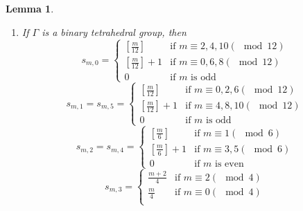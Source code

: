 \documentclass{amsart}[12pt]
\newtheorem{lemma}[theorem]{Lemma}
\theoremstyle{definition}
\theoremstyle{remark}
\numberwithin{equation}{section}
\begin{document}
\begin{lemma}
\begin{enumerate}
\[\begin{cases}
[\frac{m}{2n - 4}] + 1 & \textrm{if $m \equiv 4k (\mod 2n - 4)$ } \\
[\frac{m}{2n - 4}] & \textrm{if $m \equiv 4k + 2 (\mod 2n - 4)$ } \\
0 & \textrm{if $m$ is odd}
\end{cases}
\]
for $0 \leq k \leq n/2 - 2$.
\[
s_{m, 1} = 
\begin{cases} 
[\frac{m}{2n - 4}] + 1 & \textrm{if $m \equiv 4k + 2 (\mod 2n - 4)$ } \\
[\frac{m}{2n - 4}] & \textrm{if $m \equiv 4k (\mod 2n - 4)$ } \\
0 & \textrm{if $m$ is odd}
\end{cases}
\]
for $0 \leq k \leq n/2 - 4$.
\[
s_{m, n - 1} = s_{m, n} =
\begin{cases} 
[\frac{m}{2n - 4}] & \textrm{if $m \equiv 2k (\mod 2n - 4)$ } \\
[\frac{m}{2n - 4}] + 1 & \textrm{if $m \equiv 2j (\mod 2n - 4)$ } \\
0 & \textrm{if $m$ is odd}
\end{cases}
\]
for $0 \leq k \leq (n - 4)/2$ and $(n - 2)/2 \leq j \leq n - 3$.
\item If $\Gamma$ is a binary tetrahedral group, then
\[
s_{m, 0} = \begin{cases} 
[\frac{m}{12}] & \textrm{if $m \equiv 2, 4, 10 (\mod 12)$ } \\
[\frac{m}{12}] + 1 & \textrm{if $m \equiv 0, 6, 8 (\mod 12)$ } \\
0 & \textrm{if $m$ is odd}
\end{cases}
\]
\[
s_{m, 1} = s_{m, 5} = \begin{cases} 
[\frac{m}{12}] & \textrm{if $m \equiv 0, 2, 6 (\mod 12)$ } \\
[\frac{m}{12}] + 1 & \textrm{if $m \equiv 4, 8, 10 (\mod 12)$ } \\
0 & \textrm{if $m$ is odd}
\end{cases}
\]
\[
s_{m, 2} = s_{m, 4} = \begin{cases} 
[\frac{m}{6}] & \textrm{if $m \equiv 1 (\mod 6)$ } \\
[\frac{m}{6}] + 1 & \textrm{if $m \equiv 3, 5 (\mod 6)$ } \\
0 & \textrm{if $m$ is even}
\end{cases}
\]
\[
s_{m, 3} = \begin{cases} 
\frac{m + 2}{4} & \textrm{if $m \equiv 2 (\mod 4)$ } \\
\frac{m}{4} & \textrm{if $m \equiv 0 (\mod 4)$ } \\

\end{cases}\]
\end{enumerate}
\end{lemma}
\end{document}
